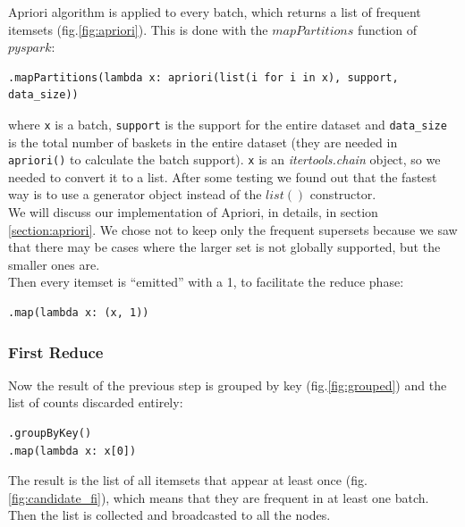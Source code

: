 \documentclass[a4paper]{article}
\begin{document}
	Apriori algorithm is applied to every batch, which returns a list of frequent itemsets (fig.\ref{fig:apriori}). This is done with the $mapPartitions$ function of $pyspark$: 
\begin{lstlisting}
.mapPartitions(lambda x: apriori(list(i for i in x), support, data_size))
\end{lstlisting}
	where \texttt{x} is a batch, \texttt{support} is the support for the entire dataset and \texttt{data\_size} is the total number of baskets in the entire dataset (they are needed in \texttt{apriori()} to calculate the batch support).
	\texttt{x} is an \textit{itertools.chain} object, so we needed to convert it to a list. After some testing we found out that the fastest way is to use a generator object instead of the $list()$ constructor.\\
	We will discuss our implementation of Apriori, in details, in section \ref{section:apriori}. We chose not to keep only the frequent supersets because we saw that there may be cases where the larger set is not globally supported, but the smaller ones are.\\
	Then every itemset is ``emitted'' with a 1, to facilitate the reduce phase:
\begin{lstlisting}
.map(lambda x: (x, 1))
\end{lstlisting}
	
	\subsubsection{First Reduce}
	Now the result of the previous step is grouped by key (fig.\ref{fig:grouped}) and the list of counts discarded entirely:
	\begin{lstlisting}
.groupByKey()
.map(lambda x: x[0])
\end{lstlisting}
	The result is the list of all itemsets that appear at least once (fig.\ref{fig:candidate_fi}), which means that they are frequent in at least one batch.\\
	Then the list is collected and broadcasted to all the nodes.
	
\end{document}
